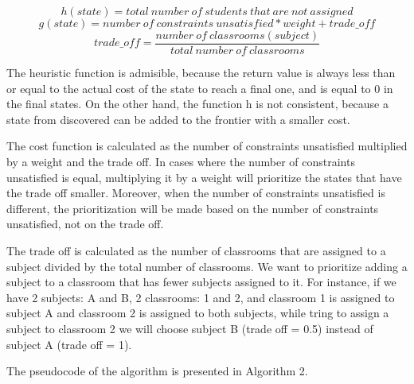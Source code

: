 \documentclass[runningheads]{paper}
\begin{document}
\begin{equation}
    h(state) = total\ number\ of\ students\ that\ are\ not\ assigned
\end{equation}
\begin{equation}
    g(state) = number\ of\ constraints\ unsatisfied * weight + trade\_off
\end{equation}
\begin{equation}
    trade\_off = \frac{number\ of\ classrooms(subject)}{total\ number\ of\ classrooms} 
\end{equation}

The heuristic function is admisible, because the return value is always less than
or equal to the actual cost of the state to reach a final one, and is
equal to 0 in the final states. On the other hand, the function h is not consistent,
because a state from discovered can be added to the frontier with a smaller cost.

The cost function is calculated as the number of constraints unsatisfied multiplied
by a weight and the trade off. In cases where the number of constraints unsatisfied
is equal, multiplying it by a weight will prioritize the states that have the trade
off smaller. Moreover, when the number of constraints unsatisfied is different, the
prioritization will be made based on the number of constraints unsatisfied, not on
the trade off.

The trade off is calculated as the number of classrooms that are assigned to a
subject divided by the total number of classrooms. We want to prioritize adding
a subject to a classroom that has fewer subjects assigned to it. For instance,
if we have 2 subjects: A and B, 2 classrooms: 1 and 2, and classroom 1 is assigned
to subject A and classroom 2 is assigned to both subjects, while tring to assign
a subject to classroom 2 we will choose subject B (trade off = 0.5) instead of
subject A (trade off = 1).

The pseudocode of the algorithm is presented in Algorithm 2.
\end{document}
